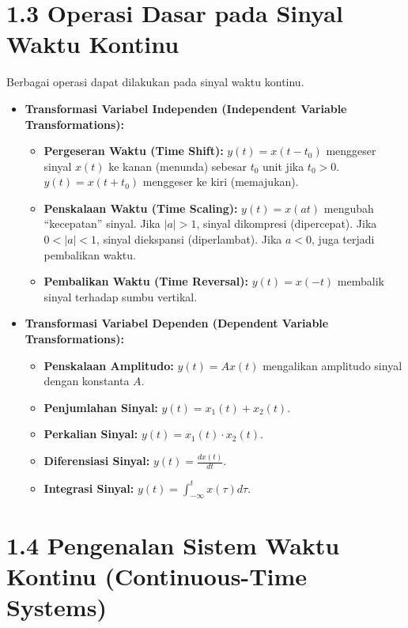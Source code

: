 \documentclass[
  letterpaper,
  DIV=11,
  numbers=noendperiod]{scrreprt}
\providecommand{\tightlist}{%
  \setlength{\itemsep}{0pt}\setlength{\parskip}{0pt}}
\begin{document}
\section{1.3 Operasi Dasar pada Sinyal Waktu
Kontinu}\label{operasi-dasar-pada-sinyal-waktu-kontinu}

Berbagai operasi dapat dilakukan pada sinyal waktu kontinu.

\begin{itemize}
\item
  \textbf{Transformasi Variabel Independen (Independent Variable
  Transformations):}

  \begin{itemize}
  \tightlist
  \item
    \textbf{Pergeseran Waktu (Time Shift):} \(y(t) = x(t-t_0)\)
    menggeser sinyal \(x(t)\) ke kanan (menunda) sebesar \(t_0\) unit
    jika \(t_0 > 0\). \(y(t) = x(t+t_0)\) menggeser ke kiri (memajukan).
  \item
    \textbf{Penskalaan Waktu (Time Scaling):} \(y(t) = x(at)\) mengubah
    ``kecepatan'' sinyal. Jika \(|a|>1\), sinyal dikompresi
    (dipercepat). Jika \(0 < |a| < 1\), sinyal diekspansi (diperlambat).
    Jika \(a < 0\), juga terjadi pembalikan waktu.
  \item
    \textbf{Pembalikan Waktu (Time Reversal):} \(y(t) = x(-t)\) membalik
    sinyal terhadap sumbu vertikal.
  \end{itemize}
\item
  \textbf{Transformasi Variabel Dependen (Dependent Variable
  Transformations):}

  \begin{itemize}
  \tightlist
  \item
    \textbf{Penskalaan Amplitudo:} \(y(t) = A x(t)\) mengalikan
    amplitudo sinyal dengan konstanta \(A\).
  \item
    \textbf{Penjumlahan Sinyal:} \(y(t) = x_1(t) + x_2(t)\).
  \item
    \textbf{Perkalian Sinyal:} \(y(t) = x_1(t) \cdot x_2(t)\).
  \item
    \textbf{Diferensiasi Sinyal:} \(y(t) = \frac{dx(t)}{dt}\).
  \item
    \textbf{Integrasi Sinyal:}
    \(y(t) = \int_{-\infty}^{t} x(\tau) d\tau\).
  \end{itemize}
\end{itemize}

\section{1.4 Pengenalan Sistem Waktu Kontinu (Continuous-Time
Systems)}\label{pengenalan-sistem-waktu-kontinu-continuous-time-systems}
\end{document}
